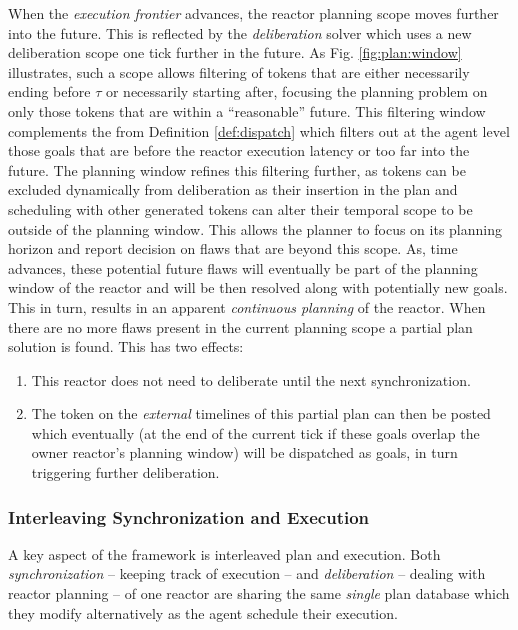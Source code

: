 When the {\em execution frontier} advances, the reactor planning scope
moves further into the future. This is reflected by the {\em
  deliberation} solver which uses a new deliberation scope one tick
further in the future. As Fig. \ref{fig:plan:window} illustrates, such
a scope allows filtering of tokens that are either necessarily ending
before $\tau$ or necessarily starting after, focusing the planning
problem on only those tokens that are within a ``reasonable'' future.
This filtering window complements the  from
Definition \ref{def:dispatch} which filters out at the agent level
those goals that are before the reactor execution latency or too far
into the future.  The planning window refines this filtering further,
as tokens can be excluded dynamically from deliberation as their
insertion in the plan and scheduling with other generated tokens can
alter their temporal scope to be outside of the planning window.  This
allows the planner to focus on its planning horizon and report
decision on flaws that are beyond this scope. As, time advances, these
potential future flaws will eventually be part of the planning window
of the reactor and will be then resolved along with potentially new
goals.  This in turn, results in an apparent \emph{continuous
  planning} of the reactor. When there are no more flaws present in
the current planning scope a partial plan solution is found. This has
two effects:

\begin{enumerate}

\item This reactor does not need to deliberate until the next
  synchronization. 

\item The token on the {\em external} timelines of this partial plan
  can then be posted which eventually (at the end of the current tick
  if these goals overlap the owner reactor's planning window) will be
  dispatched as goals, in turn triggering further deliberation.

\end{enumerate}


\subsubsection{Interleaving Synchronization and Execution}
\label{sec:arch:intertwine}

A key aspect of the \rx framework is interleaved plan and
execution. Both {\em synchronization} -- keeping track of execution --
and {\em deliberation} -- dealing with reactor planning -- of one
reactor are sharing the same {\em single} plan database which 
they modify alternatively as the \rx agent schedule their execution.

